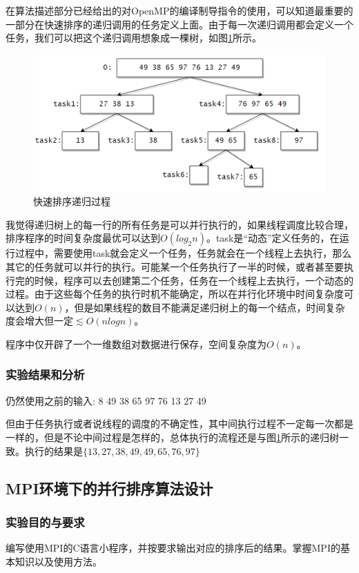 \documentclass[supercite]{Experimental_Report}
\theoremstyle{definition}
\begin{document}
在算法描述部分已经给出的对OpenMP的编译制导指令的使用，可以知道最重要的一部分在快速排序的递归调用的任务定义上面。由于每一次递归调用都会定义一个任务，我们可以把这个递归调用想象成一棵树，如图\ref{fig:p1}所示。

\begin{figure}[ht]
\centering
\includegraphics[scale=0.4]{openMP_quick_sort.png}
\caption{快速排序递归过程}
\label{fig:p1}
\end{figure}

我觉得递归树上的每一行的所有任务是可以并行执行的，如果线程调度比较合理，排序程序的时间复杂度最优可以达到$O(log_2n)$。task是“动态”定义任务的，在运行过程中，需要使用task就会定义一个任务，任务就会在一个线程上去执行，那么其它的任务就可以并行的执行。可能某一个任务执行了一半的时候，或者甚至要执行完的时候，程序可以去创建第二个任务，任务在一个线程上去执行，一个动态的过程。由于这些每个任务的执行时机不能确定，所以在并行化环境中时间复杂度可以达到$O(n)$，但是如果线程的数目不能满足递归树上的每一个结点，时间复杂度会增大但一定$\lesssim O(nlogn)$。

程序中仅开辟了一个一维数组对数据进行保存，空间复杂度为$O(n)$。

\subsubsection{实验结果和分析}
仍然使用之前的输入: 8 49 38 65 97 76 13 27 49

但由于任务执行或者说线程的调度的不确定性，其中间执行过程不一定每一次都是一样的，但是不论中间过程是怎样的，总体执行的流程还是与图\ref{fig:p1}所示的递归树一致。执行的结果是$\{13, 27, 38, 49, 49, 65, 76, 97\}$

\subsection{MPI环境下的并行排序算法设计}
\subsubsection{实验目的与要求}
编写使用MPI的C语言小程序，并按要求输出对应的排序后的结果。掌握MPI的基本知识以及使用方法。
\end{document}
